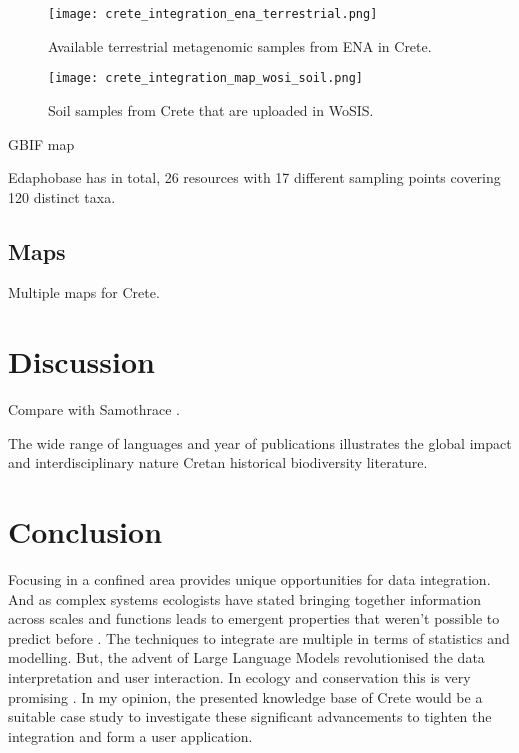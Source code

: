 \begin{figure}[h] 
    \centering\texttt{[image: crete\_integration\_ena\_terrestrial.png]}
    \caption{Available terrestrial metagenomic samples from ENA in Crete.}
    \label{fig:isd_crete_ena}
\end{figure}


\begin{figure}[h] 
    \centering\texttt{[image: crete\_integration\_map\_wosi\_soil.png]}
    \caption{Soil samples from Crete that are uploaded in WoSIS.}
    \label{fig:isd_crete_wosis}
\end{figure}

GBIF map 

Edaphobase has in total, 26 resources with 17 different sampling points covering 120 distinct taxa.



\subsection{Maps}

Multiple maps for Crete.


\section{Discussion}\label{crete_idea_discussion}

Compare with Samothrace \parencite{noll2024insights}.

The wide range of languages and year of publications illustrates the global impact and interdisciplinary nature Cretan historical biodiversity literature.

\section{Conclusion}

Focusing in a confined area provides unique opportunities for data integration.
And as complex systems ecologists have stated bringing together information across
scales \parencite{brown2004METABOLIC} and functions leads to emergent properties that weren't possible to 
predict before \parencite{smith2016Origin}. The techniques to integrate are multiple in terms of statistics and modelling. But,
the advent of Large Language Models revolutionised the data interpretation and 
user interaction. In ecology and conservation this is very promising \parencite{doi2024biodiversity}.
In my opinion, the presented knowledge base of Crete would be a suitable 
case study to investigate these significant advancements to tighten the integration and form a 
user application.

